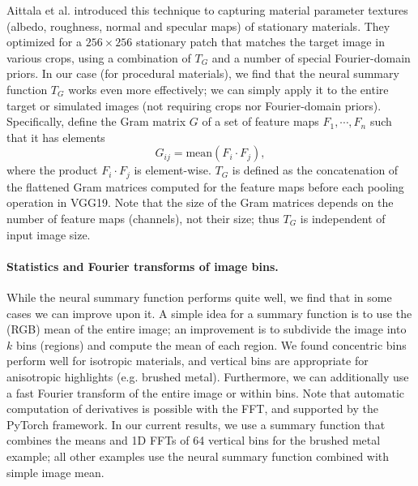 Aittala et al. \cite{Aittala2016} introduced this technique to capturing material parameter textures (albedo, roughness, normal and specular maps) of stationary materials. They optimized for a $256 \times 256$ stationary patch that matches the target image in various crops, using a combination of $T_G$ and a number of special Fourier-domain priors. In our case (for procedural materials), we find that the neural summary function $T_G$ works even more effectively; we can simply apply it to the entire target or simulated images (not requiring crops nor Fourier-domain priors).
%
Specifically, define the Gram matrix $G$ of a set of feature maps $F_1, \cdots, F_n$ such that it has elements
\begin{equation}
	G_{ij} = \mbox{mean}(F_i \cdot F_j),
\end{equation}
where the product $F_i \cdot F_j$ is element-wise. $T_G$ is defined as the concatenation of the flattened Gram matrices computed for the feature maps before each pooling operation in VGG19. Note that the size of the Gram matrices depends on the number of feature maps (channels), not their size; thus $T_G$ is independent of input image size.

\label{ssec:example_summary_func}

\paragraph*{Statistics and Fourier transforms of image bins.}
While the neural summary function performs quite well, we find that in some cases we can improve upon it.
A simple idea for a summary function is to use the (RGB) mean of the entire image; an improvement is to subdivide the image into $k$ bins (regions) and compute the mean of each region. We found concentric bins perform well for isotropic materials, and vertical bins are appropriate for anisotropic highlights (e.g. brushed metal). Furthermore, we can additionally use a fast Fourier transform of the entire image or within bins. Note that automatic computation of derivatives is possible with the FFT, and supported by the PyTorch framework. In our current results, we use a summary function that combines the means and 1D FFTs of 64 vertical bins for the brushed metal example; all other examples use the neural summary function combined with simple image mean.


% 